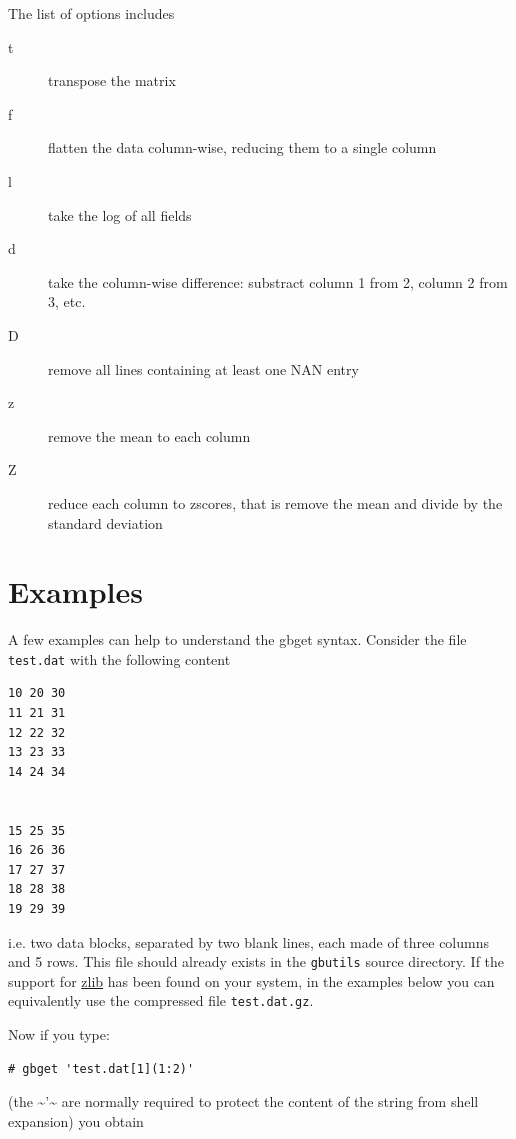 \documentclass[11pt]{article}
\begin{document}
The list of options includes

\begin{description}
\item[{t}] transpose the matrix

\item[{f}] flatten the data column-wise, reducing them to a single column

\item[{l}] take the log of all fields

\item[{d}] take the column-wise difference: substract column 1 from 2,
column 2 from 3, etc.

\item[{D}] remove all lines containing at least one NAN entry

\item[{z}] remove the mean to each column

\item[{Z}] reduce each column to zscores, that is remove the mean and
divide by the standard deviation
\end{description}
\section{Examples}
\label{sec-2}

A few examples can help to understand the gbget syntax. Consider the
file \verb~test.dat~ with the following content

\begin{verbatim}
10 20 30
11 21 31
12 22 32
13 23 33
14 24 34


15 25 35
16 26 36
17 27 37
18 28 38
19 29 39
\end{verbatim}

i.e. two data blocks, separated by two blank lines, each made of three
columns and 5 rows. This file should already exists in the \verb~gbutils~
source directory. If the support for \href{http://www.gzip.org/zlib/}{zlib} has been found on your
system, in the examples below you can equivalently use the compressed
file \verb~test.dat.gz~.

Now if you type:

\begin{verbatim}
# gbget 'test.dat[1](1:2)'
\end{verbatim}

(the \textasciitilde{}'\textasciitilde{} are normally required to protect the content of the string
from shell expansion) you obtain
\end{document}
